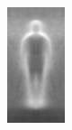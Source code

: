 \documentclass[thesis.tex]{subfiles}
\begin{document}
\begin{figure}[tb]
{\begin{subfigure}[t]{0.1635\textwidth}
		\includegraphics[width=\textwidth]{img/inriaPosTrainMeanM.png}
		\caption{}
		\label{fig:inriaPosTrainMeanM}
		\vspace{2mm}
	\end{subfigure}
	\begin{subfigure}[t]{0.17\textwidth}

\end{subfigure}}
\end{figure}
\end{document}
